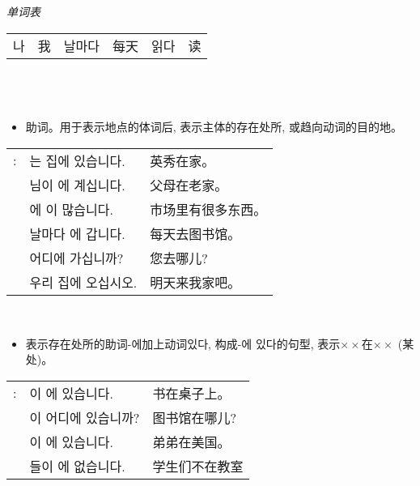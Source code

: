 \noindent \textit{单词表}\\

\begin{tabular}{ll|ll|ll}
	나 & 我 & 날마다 & 每天 & 읽다 & 读
\end{tabular}\\
\section{\kr{}}
\begin{grammar}
	\begin{grammarsect}[\kr -에]
		\begin{itemize}
			\item 助词。用于表示地点的体词后, 表示主体的存在处所, 或趋向动词的目的地。
		\end{itemize}
		\begin{tabular}{lll}
			\kr\ruby{例}{예}: & \kr\ruby{英秀}{영수}는 집에 있습니다.              & 英秀在家。     \\
			                & \kr\ruby{父母}{부모}님이 \ruby{故鄉}{고향}에 계십니다. & 父母在老家。    \\
			                & \kr\ruby{市場}{시장}에 \ruby{物件}{물건}이 많습니다.  & 市场里有很多东西。 \\
			                & \kr 날마다 \ruby{圖書館}{도서관}에 갑니다.           & 每天去图书馆。   \\
			                & \kr 어디에 가십니까?                           & 您去哪儿?     \\
			                & \kr\ruby{來日}{내일} 우리 집에 오십시오.            & 明天来我家吧。
		\end{tabular}\\
		\begin{itemize}
			\item 表示存在处所的助词{\kr-에}加上动词{\kr 있다}, 构成{\kr -에 있다}的句型, 表示$\times \times$在$\times \times$ (某处)。
		\end{itemize}
		\begin{tabular}{lll}
			\kr \ruby{例}{예}: & \kr \ruby{冊}{책}이 \ruby{冊床}{책상}에 있습니다.    & 书在桌子上。  \\
			                 & \kr \ruby{圖書館}{도서관}이 어디에 있습니까?           & 图书馆在哪儿? \\
			                 & \kr \ruby{同生}{동생}이 \ruby{美國}{미국}에 있습니다.  & 弟弟在美国。  \\
			                 & \kr \ruby{學生}{학생}들이 \ruby{教室}{교실}에 없습니다. & 学生们不在教室 \\

\end{tabular}
\end{grammarsect}
\end{grammar}
